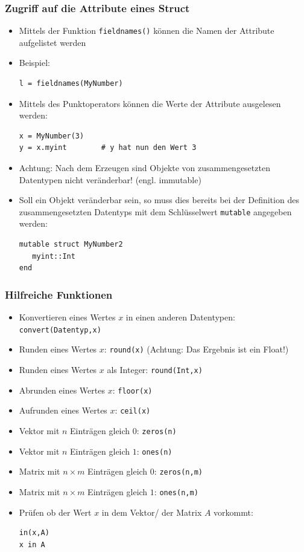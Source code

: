 \begin{frame}[fragile]
\frametitle{Zugriff auf die Attribute eines Struct}
\begin{itemize}[<+->]
\item Mittels der Funktion \verb+fieldnames()+ können die Namen der Attribute aufgelistet werden
\item Beispiel:
\begin{verbatim}
l = fieldnames(MyNumber)
\end{verbatim}
\item Mittels des Punktoperators können die Werte der Attribute ausgelesen werden:
\begin{verbatim}
x = MyNumber(3)
y = x.myint        # y hat nun den Wert 3
\end{verbatim}
\item Achtung: Nach dem Erzeugen sind Objekte von zusammengesetzten Datentypen nicht veränderbar! (engl. immutable)
\item Soll ein Objekt veränderbar sein, so muss dies bereits bei der Definition des zusammengesetzten Datentyps mit dem Schlüsselwert \verb+mutable+ angegeben werden:
\begin{verbatim}
mutable struct MyNumber2
   myint::Int
end
\end{verbatim}
\end{itemize}
\end{frame}
\begin{frame}[fragile]
\frametitle{Hilfreiche Funktionen}
\begin{itemize}[<+->]
\item Konvertieren eines Wertes $x$ in einen anderen Datentypen: \verb+convert(Datentyp,x)+
\item Runden eines Wertes $x$: \verb+round(x)+ (Achtung: Das Ergebnis ist ein Float!)
\item Runden eines Wertes $x$ als Integer: \verb+round(Int,x)+
\item Abrunden eines Wertes $x$: \verb+floor(x)+
\item Aufrunden eines Wertes $x$: \verb+ceil(x)+
\item Vektor mit $n$ Einträgen gleich $0$: \verb+zeros(n)+
\item Vektor mit $n$ Einträgen gleich $1$: \verb+ones(n)+
\item Matrix mit $n\times m$ Einträgen gleich $0$: \verb+zeros(n,m)+
\item Matrix mit $n\times m$ Einträgen gleich $1$: \verb+ones(n,m)+
\item Prüfen ob der Wert $x$ in dem Vektor/ der Matrix $A$ vorkommt:
\begin{verbatim}
in(x,A)
x in A
\end{verbatim}
\end{itemize}
\end{frame}
